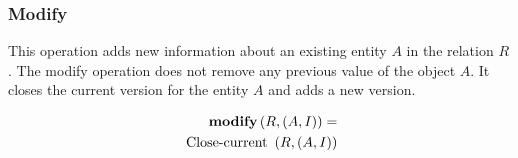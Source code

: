 %
\subsubsection{\label{subsubsec:modify}Modify}
This operation adds new information about an existing entity $A$ in the relation $R$. The modify operation does not remove any previous value of the object $A$. It closes the current version for the entity $A$ and adds a new version.



\begin{align}
\label{eq:modify}
\MOD \left( R, \left(A, I \right)\right) =\\
\nonumber
\mbox{ Close-current }\left(R, \left(A, I\right) \right) %
\end{align}


